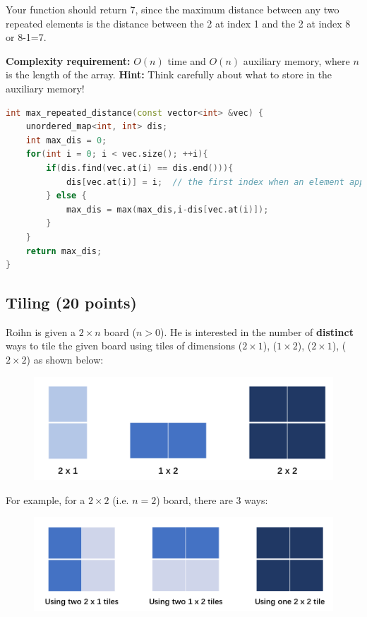\documentclass[11pt]{exam}
\begin{document}
Your function should return 7, since the maximum distance between any two repeated elements is the distance between the 2 at index 1 and the 2 at index 8 or 8-1=7.

\textbf{Complexity requirement:} $O(n)$ time and $O(n)$ auxiliary memory, where $n$ is the length of the array.
\textbf{Hint:} Think carefully about what to store in the auxiliary memory!

\begin{solution}
\begin{lstlisting}[language=c++]
int max_repeated_distance(const vector<int> &vec) {
    unordered_map<int, int> dis;
    int max_dis = 0;
    for(int i = 0; i < vec.size(); ++i){
        if(dis.find(vec.at(i) == dis.end())){
            dis[vec.at(i)] = i;  // the first index when an element appear
        } else {
            max_dis = max(max_dis,i-dis[vec.at(i)]);
        }
    }
    return max_dis;
}
\end{lstlisting}
\end{solution}

\subsection{Tiling (20 points)}

Roihn is given a $2\times n$ board ($n>0$). He is interested in the number of \textbf{distinct} ways to tile the given board using tiles of dimensions ($2\times 1$), ($1\times 2$), ($2\times 1$), ($2\times 2$) as shown below:
\begin{figure}[H]
\centering
\includegraphics[width=.7\linewidth]{tile.png}
\end{figure}
For example, for a $2\times 2$ (i.e. $n=2$) board, there are 3 ways:
\begin{figure}[H]
\centering
\includegraphics[width=.8\linewidth]{tile2x2.png}
\end{figure}
\end{document}
